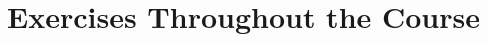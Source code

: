 \chapter{Exercises Throughout the Course}
\setlength{\headheight}{12.71342pt}
\addtolength{\topmargin}{-0.71342pt}

